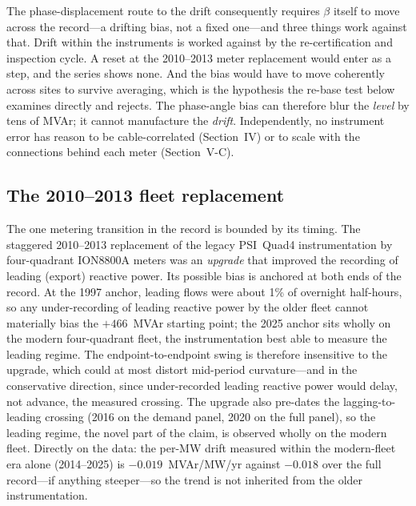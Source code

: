 \documentclass[journal]{IEEEtran}
\begin{document}
The phase-displacement route to the drift consequently requires $\beta$ itself
to move across the record---a drifting bias, not a fixed one---and three things
work against that. Drift within the instruments is worked against by the
re-certification and inspection cycle. A reset at the 2010--2013 meter
replacement would enter as a step, and the series shows none. And the bias
would have to move coherently across sites to survive averaging, which is the
hypothesis the re-base test below examines directly and rejects. The
phase-angle bias can therefore blur the \emph{level} by tens of MVAr; it cannot
manufacture the \emph{drift}. Independently, no instrument error has reason to
be cable-correlated (Section~IV) or to scale with the connections behind each
meter (Section~V-C).

\subsection{The 2010--2013 fleet replacement}
The one metering transition in the record is bounded by its timing. The
staggered 2010--2013 replacement of the legacy PSI~Quad4 instrumentation by
four-quadrant ION8800A meters was an \emph{upgrade} that improved the recording
of leading (export) reactive power. Its possible bias is anchored at both ends
of the record. At the 1997 anchor, leading flows were about 1\% of overnight
half-hours, so any under-recording of leading reactive power by the older fleet
cannot materially bias the $+466$~MVAr starting point; the 2025 anchor sits
wholly on the modern four-quadrant fleet, the instrumentation best able to
measure the leading regime. The endpoint-to-endpoint swing is therefore
insensitive to the upgrade, which could at most distort mid-period
curvature---and in the conservative direction, since under-recorded leading
reactive power would delay, not advance, the measured crossing. The upgrade also
pre-dates the lagging-to-leading crossing (2016 on the demand panel, 2020 on the
full panel), so the leading regime, the novel part of the claim, is observed
wholly on the modern fleet. Directly on the data: the per-MW drift measured
within the modern-fleet era alone (2014--2025) is $-0.019$~MVAr/MW/yr against
$-0.018$ over the full record---if anything steeper---so the trend is not
inherited from the older instrumentation.
\end{document}

